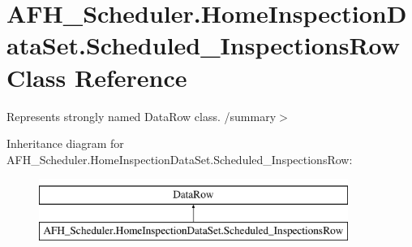 \section{A\+F\+H\+\_\+\+Scheduler.\+Home\+Inspection\+Data\+Set.\+Scheduled\+\_\+\+Inspections\+Row Class Reference}
\label{class_a_f_h___scheduler_1_1_home_inspection_data_set_1_1_scheduled___inspections_row}


Represents strongly named Data\+Row class. /summary$>$  


Inheritance diagram for A\+F\+H\+\_\+\+Scheduler.\+Home\+Inspection\+Data\+Set.\+Scheduled\+\_\+\+Inspections\+Row\+:\begin{figure}[H]
\begin{center}
\leavevmode
\includegraphics[height=2.000000cm]{class_a_f_h___scheduler_1_1_home_inspection_data_set_1_1_scheduled___inspections_row}
\end{center}
\end{figure}
